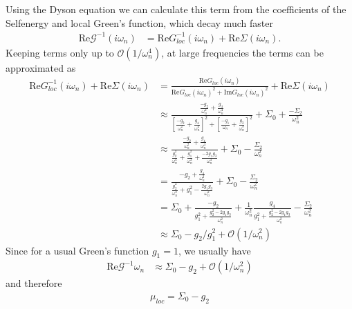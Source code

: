\documentclass[12pt,a4paper]{scrartcl}
\numberwithin{equation}{section}
\begin{document}
Using the Dyson equation we can calculate this term from the coefficients of the
Selfenergy and local Green's function, which decay much faster
\begin{align}
 \mathrm{Re}\mathscr{G}^{-1}(i\omega_n)
 &= \mathrm{Re}G^{-1}_{loc}(i\omega_n) + \mathrm{Re}\Sigma(i\omega_n).
\end{align}
Keeping terms only up to $\mathcal{O}(1/\omega_n^4)$, at large frequencies the terms can be approximated as
\begin{align}
 \mathrm{Re}G^{-1}_{loc}(i\omega_n) + \mathrm{Re}\Sigma(i\omega_n)
 &= \frac{\mathrm{Re}G_{loc}(i\omega_n)}{\mathrm{Re}G_{loc}(i\omega_n)^2+\mathrm{Im}G_{loc}(i\omega_n)^2}
     + \mathrm{Re}\Sigma(i\omega_n)\\
%
&\approx \frac{ \frac{-g_2}{\omega_n^2} + \frac{g_4}{\omega_n^4}  }
              { \left[ \frac{-g_2}{\omega_n^2} + \frac{g_4}{\omega_n^4} \right]^2
             +  \left[ \frac{-g_1}{\omega_n}     + \frac{g_3}{\omega_n^3} \right]^2}
     + \Sigma_0 + \frac{-\Sigma_2}{\omega_n^2} \\
%     
&\approx \frac{ \frac{-g_2}{\omega_n^2} + \frac{g_4}{\omega_n^4}  }
              { \frac{g_2^2}{\omega_n^4}
             +   \frac{g_1^2}{\omega_n^2}  + \frac{-2g_1g_3}{\omega_n^4} }
     + \Sigma_0 - \frac{\Sigma_2}{\omega_n^2} \\
%     
&= \frac{ -g_2 + \frac{g_4}{\omega_n^2}  }{ \frac{g_2^2}{\omega_n^2}
             +   g_1^2  - \frac{2g_1g_3}{\omega_n^2} }
     + \Sigma_0 - \frac{\Sigma_2}{\omega_n^2} \\
%     
&= \Sigma_0 + \frac{ -g_2}{ g_1^2 +  \frac{g_2^2-2g_1g_3}{\omega_n^2} }
         + \frac{1}{\omega_n^2} \frac{ g_4 }{ g_1^2 +  \frac{g_2^2-2g_1g_3}{\omega_n^2} }
     - \frac{\Sigma_2}{\omega_n^2} \\
%
&\approx \Sigma_0 - g_2/g_1^2
         + \mathcal{O}(1/\omega_n^2)
%
\end{align}
Since for a usual Green's function $g_1=1$, we usually have 
\begin{align}
 \mathrm{Re}\mathscr{G}^{-1}\omega_n
&\approx \Sigma_0 - g_2
         + \mathcal{O}(1/\omega_n^2)
%
\end{align}
and therefore
\begin{align}
 \mu_{loc} = \Sigma_0 - g_2
\end{align}


\end{document}
